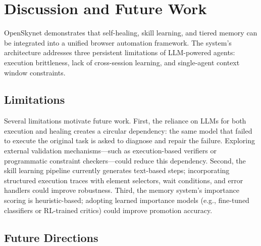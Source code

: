 \section{Discussion and Future Work}
\label{sec:conclusion}

OpenSkynet demonstrates that self-healing, skill learning, and tiered memory can be integrated into a unified browser automation framework. The system's architecture addresses three persistent limitations of LLM-powered agents: execution brittleness, lack of cross-session learning, and single-agent context window constraints.

\subsection{Limitations}

Several limitations motivate future work. First, the reliance on LLMs for both execution and healing creates a circular dependency: the same model that failed to execute the original task is asked to diagnose and repair the failure. Exploring external validation mechanisms---such as execution-based verifiers or programmatic constraint checkers---could reduce this dependency. Second, the skill learning pipeline currently generates text-based steps; incorporating structured execution traces with element selectors, wait conditions, and error handlers could improve robustness. Third, the memory system's importance scoring is heuristic-based; adopting learned importance models (e.g., fine-tuned classifiers or RL-trained critics) could improve promotion accuracy.

\subsection{Future Directions}

